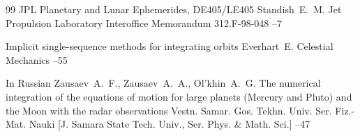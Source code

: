 \begin{thebibliography}{99}
\preprint JPL Planetary and Lunar Ephemerides, DE405/LE405
\by Standish~E.~M.
\preprintinfo Jet Propulsion Laboratory Interoffice Memorandum 312.F-98-048
--7

\paper Implicit single-sequence methods for integrating orbits
\by Everhart~E.
\jour Celestial Mechanics
--55

\lang In Russian
\by Zausaev~A.~F., Zausaev~A.~A., Ol'khin~A.~G.
\paper The numerical integration of the equations of motion for large planets (Mercury and Pluto) and the Moon with the radar observations
\jour  Vestn. Samar. Gos. Tekhn. Univ. Ser. Fiz.-Mat. Nauki \rm [J. Samara State Tech. Univ., Ser. Phys. \& Math. Sci.]
--47





\end{thebibliography}

\EngDate


\newpage
\Russian 
 
%
%
%
